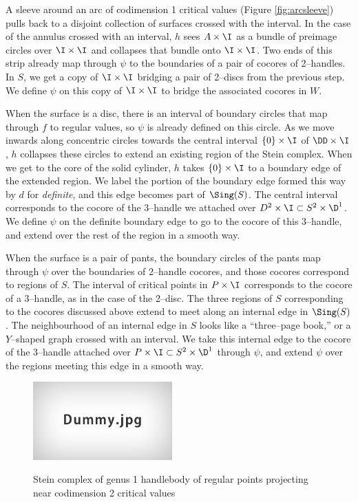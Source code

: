 	
	A sleeve around an arc of codimension 1 critical values (Figure \ref{fig:arcsleeve}) pulls back to a disjoint collection of surfaces crossed with the interval.
	In the case of the annulus crossed with an interval, $h$ sees $A\times\I$ as a bundle of preimage circles over $\I\times\I$ and collapses that bundle onto $\I\times\I$.
	Two ends of this strip already map through $\psi$ to the boundaries of a pair of cocores of 2--handles.
	In $S$, we get a copy of $\I\times\I$ bridging a pair of 2--discs from the previous step.
	We define $\psi$ on this copy of $\I\times\I$ to bridge the associated cocores in $W$.
	
	When the surface is a disc, there is an interval of boundary circles that map through $f$ to regular values, so $\psi$ is already defined on this circle.
	As we move inwards along concentric circles towards the central interval $\{0\}\times\I$ of $\DD\times\I$, $h$ collapses these circles to extend an existing region of the Stein complex.
	When we get to the core of the solid cylinder, $h$ takes $\{0\}\times\I$ to a boundary edge of the extended region.
	We label the portion of the boundary edge formed this way by $d$ for \emph{definite}, and this edge becomes part of $\Sing(S)$.
	The central interval corresponds to the cocore of the 3--handle we attached over $D^2\times\I\subset S^2\times\D^1$.
	We define $\psi$ on the definite boundary edge to go to the cocore of this 3--handle, and extend over the rest of the region in a smooth way.
	
	When the surface is a pair of pants, the boundary circles of the pants map through $\psi$ over the boundaries of 2--handle cocores, and those cocores correspond to regions of $S$.
	The interval of critical points in $P\times\I$ corresponds to the cocore of a 3--handle, as in the case of the 2--disc.
	The three regions of $S$ corresponding to the cocores discussed above extend to meet along an internal edge in $\Sing(S)$.
	The neighbourhood of an internal edge in $S$ looks like a ``three--page book,'' or a $Y$--shaped graph crossed with an interval.
	We take this internal edge to the cocore of the 3--handle attached over $P\times\I\subset S^2\times\D^1$ through $\psi$, and extend $\psi$ over the regions meeting this edge in a smooth way.
	
	\begin{figure}
		\centering
		\captionsetup{justification=centering}
		\caption{Stein complex of genus 1 handlebody of regular points projecting near codimension 2 critical values}
		\includegraphics[height=3cm]{figures/dummy.jpg}
		\label{fig:codim2steinregular}
	\end{figure}
	
